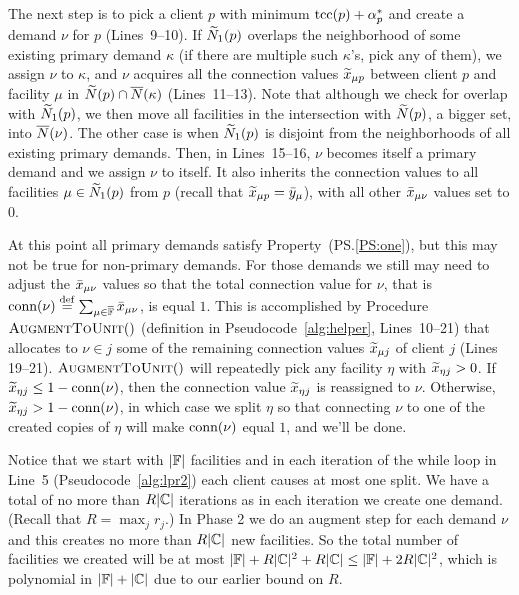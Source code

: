 \documentclass[oneside,final]{ucr}
\begin{document}
The next step is to pick a client $p$ with minimum
$\mbox{\rm{tcc}}(p)+\alpha_p^\ast$ and create a demand $\nu$ for $p$
(Lines~9--10). If ${\widetilde N}_1(p)$ overlaps the neighborhood
of some existing primary demand $\kappa$ (if there are
multiple such $\kappa$'s, pick any of them), we assign $\nu$
to $\kappa$, and $\nu$ acquires all the connection values
${\widetilde x}_{\mu p}$ between client $p$ and facility $\mu$ in
${\widetilde N}(p)\cap {\overline{N}}(\kappa)$ (Lines~11--13). Note that
although we check for overlap with ${\widetilde N}_1(p)$, we then
move all facilities in the intersection with ${\widetilde N}(p)$,
a bigger set, into ${\overline{N}}(\nu)$.  The other case is when
${\widetilde N}_1(p)$ is disjoint from the neighborhoods of all
existing primary demands. Then, in Lines~15--16, $\nu$
becomes itself a primary demand and we assign $\nu$ to
itself. It also inherits the connection values to all
facilities $\mu\in{\widetilde N}_1(p)$ from $p$ (recall that
${\widetilde x}_{\mu p} = {\bar y}_{\mu}$), with all other
${\bar x}_{\mu\nu}$ values set to $0$.

At this point all primary demands satisfy
Property~(PS.\ref{PS:one}), but this may not be true for
non-primary demands. For those demands we still may need to
adjust the ${\bar x}_{\mu\nu}$ values so that the total
connection value for $\nu$, that is ${\textrm{conn}}(\nu) \stackrel{\mathrm{def}}{=}
\sum_{\mu\in\overline{\mathbb{F}}}{\bar x}_{\mu \nu}$, is equal $1$. This
is accomplished by Procedure ${\textsc{AugmentToUnit}}()$ (definition
in Pseudocode~\ref{alg:helper}, Lines~10--21) that allocates
to $\nu\in j$ some of the remaining connection values
${\widetilde x}_{\mu j}$ of client $j$ (Lines 19--21).
${\textsc{AugmentToUnit}}()$ will repeatedly pick any facility $\eta$ with
${\widetilde x}_{\eta j} >0$.  If ${\widetilde x}_{\eta j} \leq
1-{\textrm{conn}}(\nu)$, then the connection value ${\widetilde x}_{\eta
  j}$ is reassigned to $\nu$. 
Otherwise, ${\widetilde x}_{\eta j} >
1-{\textrm{conn}}(\nu)$, in which case we split $\eta$ so that
connecting $\nu$ to one of the created copies of $\eta$ will
make ${\textrm{conn}}(\nu)$ equal $1$, and we'll be done.


\smallskip

Notice that we start with $|\mathbb{F}|$ facilities and in
each iteration of the while loop in Line~5 (Pseudocode~\ref{alg:lpr2}) each client causes at most one split.
 We have a total of no more than $R|\mathbb{C}|$ iterations as in
each iteration we create one demand. (Recall that $R =
\max_jr_j$.) In Phase 2 we do an augment step for each
demand $\nu$ and this creates no more than $R|\mathbb{C}|$
new facilities.  So the total number of facilities we
created will be at most $|\mathbb{F}|+ R|\mathbb{C}|^2 +
R|\mathbb{C}| \leq |\mathbb{F}| + 2R|\mathbb{C}|^2$, which is
polynomial in $|\mathbb{F}|+|\mathbb{C}|$ due to our earlier
bound on $R$.
\end{document}
